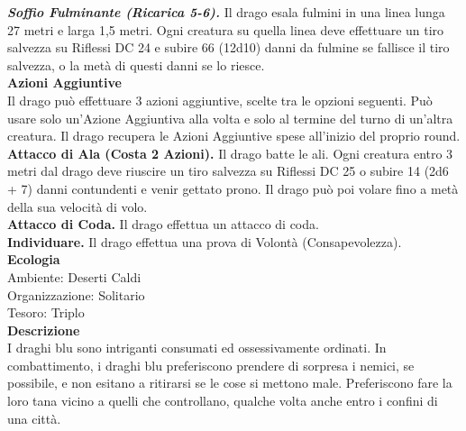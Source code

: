 \begin{multicols}{2}
\emph{\textbf{Soffio Fulminante (Ricarica 5-6).}} Il drago esala fulmini in una linea lunga 27 metri e larga 1,5 metri. Ogni creatura su quella linea deve effettuare un tiro salvezza su Riflessi DC  24 e subire 66 (12d10) danni da fulmine se fallisce il tiro salvezza, o la metà di questi danni se lo riesce.\\
\textbf{Azioni Aggiuntive}\\
Il drago può effettuare 3 azioni aggiuntive, scelte tra le opzioni seguenti. Può usare solo un'Azione Aggiuntiva alla volta e solo al termine del turno di un'altra creatura. Il drago recupera le Azioni Aggiuntive spese all'inizio del proprio round.\\
\textbf{Attacco di Ala (Costa 2 Azioni).} Il drago batte le ali. Ogni creatura entro 3 metri dal drago deve riuscire un tiro salvezza su Riflessi DC  25 o subire 14 (2d6 + 7) danni contundenti e venir gettato prono. Il drago può poi volare fino a metà della sua velocità di volo.\\
\textbf{Attacco di Coda.} Il drago effettua un attacco di coda.\\
\textbf{Individuare.} Il drago effettua una prova di Volontà (Consapevolezza).\\
\textbf{Ecologia}\\
Ambiente: Deserti Caldi\\
Organizzazione: Solitario\\
Tesoro: Triplo\\
\textbf{Descrizione}\\
I draghi blu sono intriganti consumati ed ossessivamente ordinati. In combattimento, i draghi blu preferiscono prendere di sorpresa i nemici, se possibile, e non esitano a ritirarsi se le cose si mettono male. Preferiscono fare la loro tana vicino a quelli che controllano, qualche volta anche entro i confini di una città.\\


\end{multicols}
